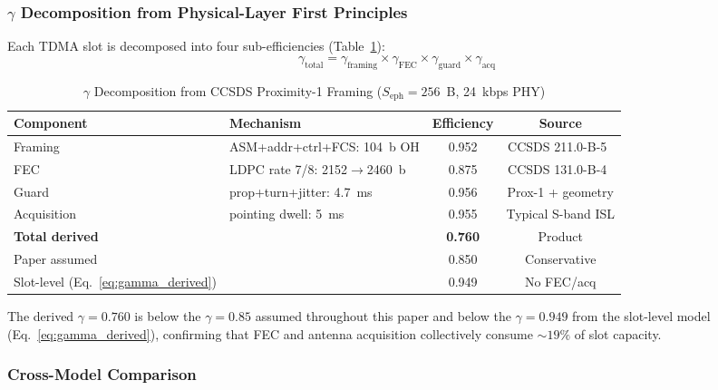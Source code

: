 \documentclass[journal]{IEEEtran}
\begin{document}
\subsubsection{$\gamma$ Decomposition from Physical-Layer First Principles}

Each TDMA slot is decomposed into four sub-efficiencies (Table~\ref{tab:gamma_decomposition}):
\begin{equation}
    \gamma_{\text{total}} = \gamma_{\text{framing}} \times \gamma_{\text{FEC}} \times \gamma_{\text{guard}} \times \gamma_{\text{acq}}
    \label{eq:gamma_decomposition}
\end{equation}

\begin{table}[t]
    \centering
    \caption{$\gamma$ Decomposition from CCSDS Proximity-1 Framing ($S_{\text{eph}} = 256$~B, 24~kbps PHY)}
    \label{tab:gamma_decomposition}
    \footnotesize
    \begin{tabular}{@{}llcc@{}}
        \toprule
        \textbf{Component} & \textbf{Mechanism} & \textbf{Efficiency} & \textbf{Source} \\
        \midrule
        Framing & ASM+addr+ctrl+FCS: 104~b OH & 0.952 & CCSDS 211.0-B-5~\cite{ccsds_prox1} \\
        FEC & LDPC rate 7/8: 2152$\to$2460~b & 0.875 & CCSDS 131.0-B-4~\cite{ccsds_sync_coding} \\
        Guard & prop+turn+jitter: 4.7~ms & 0.956 & Prox-1 + geometry \\
        Acquisition & pointing dwell: 5~ms & 0.955 & Typical S-band ISL \\
        \midrule
        \textbf{Total derived} & & \textbf{0.760} & Product \\
        Paper assumed & & 0.850 & Conservative \\
        Slot-level (Eq.~\ref{eq:gamma_derived}) & & 0.949 & No FEC/acq \\
        \bottomrule
    \end{tabular}
\end{table}

The derived $\gamma = 0.760$ is below the $\gamma = 0.85$ assumed throughout this paper and below the $\gamma = 0.949$ from the slot-level model (Eq.~\ref{eq:gamma_derived}), confirming that FEC and antenna acquisition collectively consume ${\sim}19\%$ of slot capacity.

\subsubsection{Cross-Model Comparison}
\end{document}
